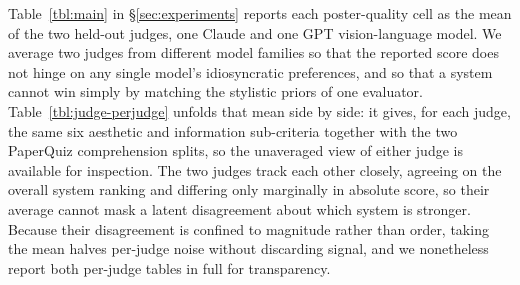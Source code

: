 \documentclass{article}
\begin{document}
Table~\ref{tbl:main} in \S\ref{sec:experiments} reports each poster-quality cell as the mean of the two held-out judges, one Claude and one GPT vision-language model. We average two judges from different model families so that the reported score does not hinge on any single model's idiosyncratic preferences, and so that a system cannot win simply by matching the stylistic priors of one evaluator. Table~\ref{tbl:judge-perjudge} unfolds that mean side by side: it gives, for each judge, the same six aesthetic and information sub-criteria together with the two PaperQuiz comprehension splits, so the unaveraged view of either judge is available for inspection. The two judges track each other closely, agreeing on the overall system ranking and differing only marginally in absolute score, so their average cannot mask a latent disagreement about which system is stronger. Because their disagreement is confined to magnitude rather than order, taking the mean halves per-judge noise without discarding signal, and we nonetheless report both per-judge tables in full for transparency.
\end{document}
